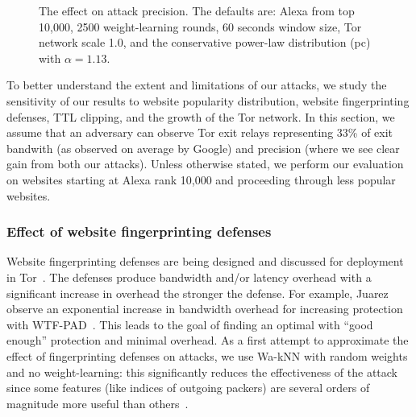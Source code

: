 \begin{figure}[t]
{    \label{fig:wfdns:var:scale}
}
\caption{The effect on attack precision. The defaults are: Alexa from top 10,000,
2500 weight-learning rounds,
60 seconds window size, Tor network scale 1.0, and the conservative
power-law distribution (pc) with $\alpha=1.13$.}
\label{fig:wfdns:var}
\end{figure}
\fi

To better understand the extent and limitations of our attacks, we
study the sensitivity of our results to website popularity distribution,
website fingerprinting defenses, TTL clipping, and the growth of the Tor
network.  In this section, we assume that an adversary can observe Tor
exit relays representing 33\% of exit bandwith (as observed on average
by Google) and precision (where we see clear gain from both our
attacks).  Unless otherwise stated, we perform our evaluation on
websites starting at Alexa rank 10,000 and proceeding through less
popular websites.



\subsubsection{Effect of website fingerprinting defenses}

Website fingerprinting defenses are being
designed and discussed for deployment in Tor~\cite{adapativepadding}.
The defenses produce bandwidth and/or latency overhead with a significant
increase in overhead the stronger the defense. For example, Juarez \ea
observe an exponential increase in bandwidth overhead for increasing protection
with WTF-PAD~\cite{DBLP:journals/corr/JuarezIPDW15}.
This leads to the goal of finding an optimal with ``good enough''
protection and minimal overhead.
As a first attempt to approximate the effect of fingerprinting
defenses on \name attacks, we use Wa-kNN with
random weights and no weight-learning: this significantly reduces the
effectiveness of the attack since some features (like indices of outgoing
packers) are several orders of magnitude more useful
than others~\cite{DBLP:journals/corr/JuarezIPDW15}.

